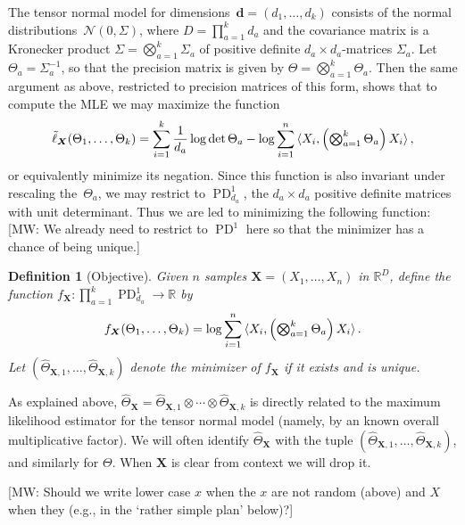 \documentclass{article}
\newtheorem{definition}{Definition}
\newcommand{\R}{{\mathbb{R}}}
\newcommand{\ot}{\otimes}
\renewcommand{\vec}{\bm}
\newcommand\cN{\mathcal{N}}
\newcommand\PD{\operatorname{PD}}
\newcommand{\MW}[1]{{\color{red}[MW: #1]}}
\begin{document}
The tensor normal model for dimensions~$\vec d=(d_1,\dots,d_k)$ consists of the normal distributions~$\cN(0,\Sigma)$, where $D = \prod_{a=1}^k d_a$ and the covariance matrix is a Kronecker product $\Sigma = \bigotimes_{a=1}^k \Sigma_a$ of positive definite $d_a\times d_a$-matrices $\Sigma_a$.
Let $\Theta_a = \Sigma_a^{-1}$, so that the precision matrix is given by $\Theta = \bigotimes_{a=1}^k \Theta_a$.
Then the same argument as above, restricted to precision matrices of this form, shows that to compute the MLE we may maximize the function
\begin{align*}
  \tilde\ell_{\vec X}(\Theta_1,\dots,\Theta_k) = \sum_{i=1}^k \frac1{d_a} \log \det \Theta_a - \log \sum_{i=1}^n \braket{X_i, \left( \textstyle \bigotimes_{a=1}^k \Theta_a \right) X_i},
\end{align*}
or equivalently minimize its negation.
Since this function is also invariant under rescaling the~$\Theta_a$, we may restrict to $\PD_{d_a}^1$, the $d_a\times d_a$ positive definite matrices with unit determinant.
Thus we are led to minimizing the following function:
\MW{We already need to restrict to $\PD^1$ here so that the minimizer has a chance of being unique.}

\begin{definition}[Objective]\label{dfn:function}
Given $n$ samples $\vec{X} = (X_1, \dots, X_n)$ in $\R^D$, define the function $f_{\vec X}\colon\prod_{a=1}^k \PD_{d_a}^1 \to \R$ by
\begin{align}\label{eq:projective-likelihood}
  f_{\vec X}(\Theta_1,\dots,\Theta_k) = \log \sum_{i=1}^n \braket{X_i, \left( \textstyle \bigotimes_{a=1}^k \Theta_a \right) X_i}.
\end{align}
Let $(\widehat{\Theta}_{\vec X,1}, \dots, \widehat{\Theta}_{\vec X,k})$ denote the minimizer of $f_{\vec X}$ if it exists and is unique.
\end{definition}

\noindent
As explained above, $\widehat{\Theta}_{\vec X} = \widehat{\Theta}_{\vec X,1} \ot \cdots \ot \widehat{\Theta}_{\vec X,k}$ is directly related to the maximum likelihood estimator for the tensor normal model (namely, by an known overall multiplicative factor).
We will often identify $\widehat{\Theta}_{\vec X}$ with the tuple $(\widehat{\Theta}_{\vec X,1}, \dots, \widehat{\Theta}_{\vec X,k})$, and similarly for $\Theta$.
When $\vec X$ is clear from context we will drop it.

\MW{Should we write lower case $x$ when the $x$ are not random (above) and $X$ when they (e.g., in the `rather simple plan' below)?}
\end{document}
